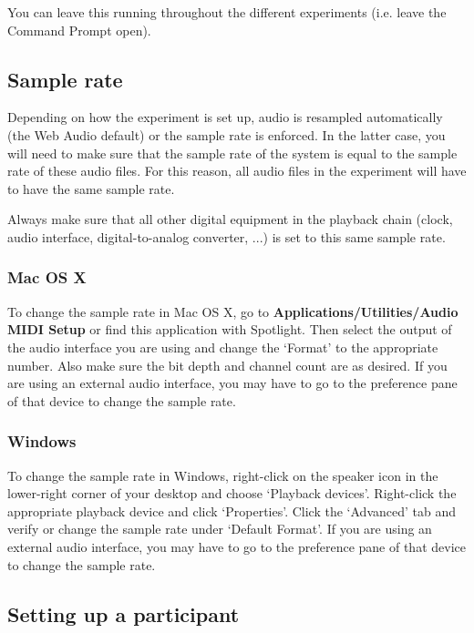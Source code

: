 \documentclass[11pt, oneside]{article}   	%
\begin{document}
	                You can leave this running throughout the different experiments (i.e. leave the Command Prompt open). 
		
		
\clearpage
	\subsection{Sample rate}
		Depending on how the experiment is set up, audio is resampled automatically (the Web Audio default) or the sample rate is enforced. In the latter case, you will need to make sure that the sample rate of the system is equal to the sample rate of these audio files. For this reason, all audio files in the experiment will have to have the same sample rate. 

		Always make sure that all other digital equipment in the playback chain (clock, audio interface, digital-to-analog converter, ...) is set to this same sample rate.
		
		\subsubsection{Mac OS X}
			To change the sample rate in Mac OS X, go to \textbf{Applications/Utilities/Audio MIDI Setup} or find this application with Spotlight. Then select the output of the audio interface you are using and change the `Format' to the appropriate number. Also make sure the bit depth and channel count are as desired. 
			If you are using an external audio interface, you may have to go to the preference pane of that device to change the sample rate. 
		
		\subsubsection{Windows}
			To change the sample rate in Windows, right-click on the speaker icon in the lower-right corner of your desktop and choose `Playback devices'. Right-click the appropriate playback device and click `Properties'. Click the `Advanced' tab and verify or change the sample rate under `Default Format'.    %
			If you are using an external audio interface, you may have to go to the preference pane of that device to change the sample rate. 
		 
				
		
	\subsection{Setting up a participant}
		
\end{document}
